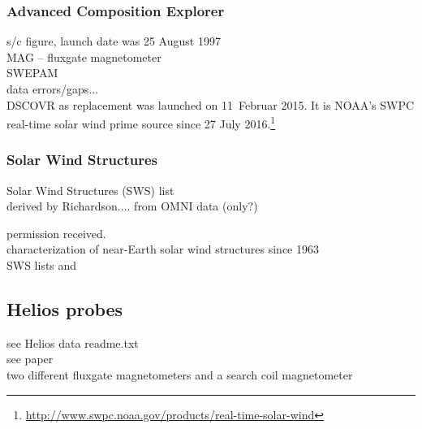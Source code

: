 \subsubsection{Advanced Composition Explorer}

s/c figure, launch date was 25 August 1997\\

MAG -- fluxgate magnetometer\\
SWEPAM\\	%

data errors/gaps...\\

DSCOVR as replacement was launched on 11~Februar 2015. It is NOAA's SWPC real-time solar wind prime source since 27 July 2016.\footnote{\url{http://www.swpc.noaa.gov/products/real-time-solar-wind}}\\


\subsubsection{Solar Wind Structures}

Solar Wind Structures (SWS) list\\
derived by Richardson.... from OMNI data (only?)

permission received.\\

characterization of near-Earth solar wind structures since 1963\\
SWS lists \citep{Richardson2000} and \citep{Richardson2012}


\subsection{Helios probes}
\label{sec:helios_probes}

see Helios data readme.txt\\
see paper\\

two different fluxgate magnetometers and a search coil magnetometer\\


